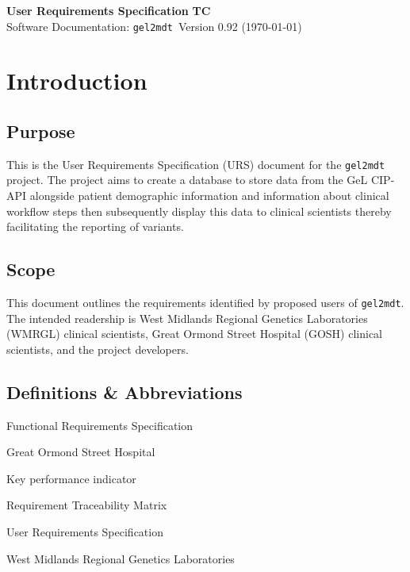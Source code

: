 \documentclass[a4paper, 10pt]{article}
\begin{document}
\noindent
\large\textbf{User Requirements Specification} \hfill \textbf{TC} \\
\normalsize Software Documentation: \texttt{gel2mdt }\hfill Version 0.92 (\today) \\

\tableofcontents

\section{Introduction}
\subsection{Purpose}
This is the User Requirements Specification (URS) document for the \texttt{gel2mdt} project. The project aims to create a database to store data from the GeL CIP-API alongside patient demographic information and information about clinical workflow steps then subsequently display this data to clinical scientists thereby facilitating the reporting of variants.

\subsection{Scope}
This document outlines the requirements identified by proposed users of \texttt{gel2mdt}. The intended readership is West Midlands Regional Genetics Laboratories (WMRGL) clinical scientists, Great Ormond Street Hospital (GOSH) clinical scientists, and the project developers.

\subsection{Definitions \& Abbreviations}
\begin{description}[align=right,labelwidth=2cm]
    \setlength\itemsep{-0.3em}
    \item [FRS] Functional Requirements Specification
    \item [GOSH] Great Ormond Street Hospital
    \item [KPI] Key performance indicator
    \item [RTM] Requirement Traceability Matrix
    \item [URS] User Requirements Specification
    \item [WMRGL] West Midlands Regional Genetics Laboratories
\end{description}
\end{document}
